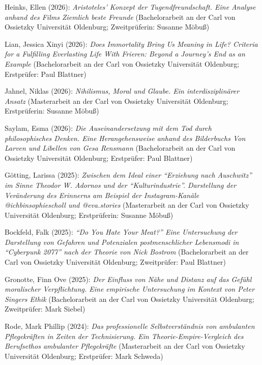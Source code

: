 \documentclass[a4paper,10pt]{article}
\newenvironment{literature}{%
   \parskip6pt\parindent0pt\raggedright
   \def\lititem{\hangindent=1cm\hangafter1}}{%
   \par\ignorespaces}
\begin{document}
\begin{literature}
\lititem Heinks, Ellen (2026): \textit{Aristoteles' Konzept der Tugendfreundschaft. Eine Analyse anhand des Films \textit{Ziemlich beste Freunde}} (Bachelorarbeit an der Carl von Ossietzky Universität Oldenburg; Zweitprüferin: Susanne Möbuß)

\lititem Lian, Jessica Xinyi (2026): \textit{Does Immortality Bring Us Meaning in Life? Criteria for a Fulfilling Everlasting Life With \textit{Frieren: Beyond a Journey's End} as an Example} (Bachelorarbeit an der Carl von Ossietzky Universität Oldenburg; Erstprüfer: Paul Blattner)

\lititem Jahnel, Niklas (2026): \textit{Nihilismus, Moral und Glaube. Ein interdisziplinärer Ansatz} (Masterarbeit an der Carl von Ossietzky Universität Oldenburg; Erstprüferin: Susanne Möbuß)

\lititem Saylam, Esma (2026): \textit{Die Auseinandersetzung mit dem Tod durch philosophisches Denken. Eine Herangehensweise anhand des Bilderbuchs \textit{Von Larven und Libellen} von Gesa Rensmann} (Bachelorarbeit an der Carl von Ossietzky Universität Oldenburg; Erstprüfer: Paul Blattner)

\lititem Götting, Larissa (2025): \textit{Zwischen dem Ideal einer \enquote{Erziehung nach Auschwitz} im Sinne Theodor W. Adornos und der \enquote{Kulturindustrie}. Darstellung der Veränderung des Erinnerns am Beispiel der Instagram-Kanäle @ichbinsophiescholl und @eva.stories} (Masterarbeit an der Carl von Ossietzky Universität Oldenburg; Erstprüferin: Susanne Möbuß)

\lititem Bockfeld, Falk (2025): \textit{\enquote{Do You Hate Your Meat?} Eine Untersuchung der Darstellung von Gefahren und Potenzialen postmenschlicher Lebensmodi in \enquote{Cyberpunk 2077} nach der Theorie von Nick Bostrom} (Bachelorarbeit an der Carl von Ossietzky Universität Oldenburg; Zweitprüfer: Paul Blattner)

\lititem Gronotte, Finn Ove (2025): \textit{Der Einfluss von Nähe und Distanz auf das Gefühl moralischer Verpflichtung. Eine empirische Untersuchung im Kontext von Peter Singers Ethik} (Bachelorarbeit an der Carl von Ossietzky Universität Oldenburg; Zweitprüfer: Mark Siebel)

\lititem Rode, Mark Phillip (2024): \textit{Das professionelle Selbstverständnis von ambulanten Pflegekräften in Zeiten der Technisierung. Ein Theorie-Empire-Vergleich des Berufsethos ambulanter Pflegekräfte} (Masterarbeit an der Carl von Ossietzky Universität Oldenburg; Erstprüfer: Mark Schweda)


\end{literature}
\end{document}
